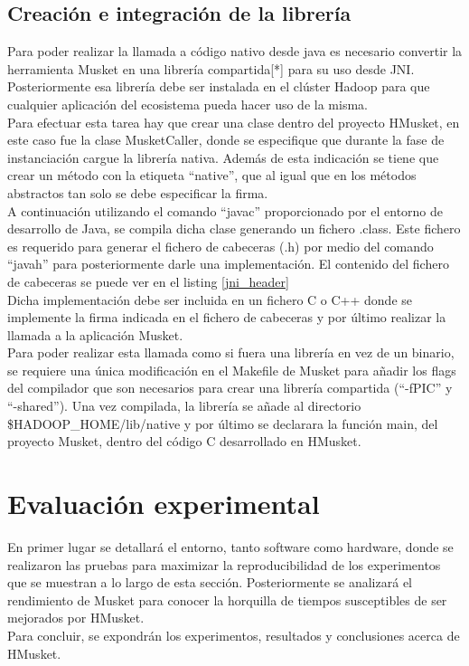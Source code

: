 \documentclass[conference]{IEEEtran}
\begin{document}
\subsection{Creación e integración de la librería}
Para poder realizar la llamada a código nativo desde java es necesario convertir la herramienta Musket en una librería compartida[*] para su uso desde JNI. Posteriormente esa librería debe ser instalada en el clúster Hadoop para que cualquier aplicación del ecosistema pueda hacer uso de la misma.\\
Para efectuar esta tarea hay que crear una clase dentro del proyecto HMusket, en este caso fue la clase MusketCaller, donde se especifique que durante la fase de instanciación cargue la librería nativa. Además de esta indicación se tiene que crear un método con la etiqueta ``native'', que al igual que en los métodos abstractos tan solo se debe especificar la firma.\\
A continuación utilizando el comando ``javac'' proporcionado por el entorno de desarrollo de Java, se compila dicha clase generando un fichero .class. Este fichero es requerido para generar el fichero de cabeceras (.h) por medio del comando ``javah'' para posteriormente darle una implementación. El contenido del fichero de cabeceras se puede ver en el listing \ref{jni_header}\\
Dicha implementación debe ser incluida en un fichero C o C++ donde se implemente la firma indicada en el fichero de cabeceras y por último realizar la llamada a la aplicación Musket.\\
Para poder realizar esta llamada como si fuera una librería en vez de un binario, se requiere una única modificación en el Makefile de Musket para añadir los flags del compilador que son necesarios para crear una librería compartida (``-fPIC'' y ``-shared''). Una vez compilada, la librería se añade al directorio \$HADOOP\_HOME/lib/native y por último se declarara la función main, del proyecto Musket, dentro del código C desarrollado en HMusket.

\section{Evaluación experimental}
En primer lugar se detallará el entorno, tanto software como hardware, donde se realizaron las pruebas para maximizar la reproducibilidad de los experimentos que se muestran a lo largo de esta sección. Posteriormente se analizará el rendimiento de Musket para conocer la horquilla de tiempos susceptibles de ser mejorados por HMusket.\\
Para concluir, se expondrán los experimentos, resultados y conclusiones acerca de HMusket.
\end{document}
